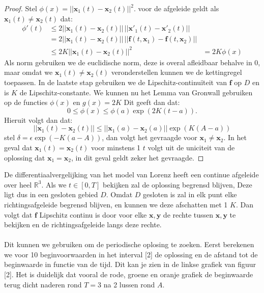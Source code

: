\documentclass[12pt, a4paper]{article}
\newcommand{\R}{\mathbb{R}}
\newcommand{\x}{\textbf{x}}
\theoremstyle{definition}
\begin{document}
\begin{proof}
Stel $\phi(x) = ||\x_1(t) - \x_2(t)||^2$. voor de afgeleide geldt als $\x_1(t) \neq \x_2(t)$ dat:
\begin{align*}
\phi'(t) &\leq 2||\x_1(t) - \x_2(t)|| \, ||\x'_1(t) - \x'_2(t)||\\
 &= 2||\x_1(t) - \x_2(t)|| \, ||\textbf{f}(t, \x_1) - \textbf{f}(t, \x_2)||\\
 &\leq 2K||\x_1(t) - \x_2(t)||^2
 &= 2K \phi(x)
\end{align*}
Als norm gebruiken we de euclidische norm, deze is overal afleidbaar behalve in $0$, maar omdat we $\x_1(t) \neq \x_2(t)$ veronderstellen kunnen we de kettingregel toepassen. In de laatste stap gebruiken we de Lipschitz-continuïteit van $\mathbf{f}$ op $D$ en is $K$ de Lipschitz-constante. We kunnen nu het Lemma van Gronwall gebruiken op de functies $\phi(x)$ en $g(x) = 2K$ Dit geeft dan dat:
$$0 \leq \phi(x) \leq \phi(a) \exp(2K(t-a)).$$
Hieruit volgt dan dat:
$$ ||\x_1(t) - \x_2(t)|| \leq ||\x_1(a) - \x_2(a)|| \exp(K(A-a)) $$
stel $\delta = \epsilon \exp(-K(a-A))$, dan volgt het gevraagde voor $\x_1 \neq \x_2$. In het geval dat $\x_1(t) = \x_2(t)$ voor minstens 1 $t$ volgt uit de uniciteit van de oplossing dat $\x_1 = \x_2$, in dit geval geldt zeker het gevraagde.
\end{proof}
De differentiaalvergelijking van het model van Lorenz heeft een continue afgeleide over heel $\R^3$. Als we $t\in [0, T]$ bekijken zal de oplossing begrensd blijven, Deze ligt dus in een gesloten gebied $D$. Omdat $D$ gesloten is zal in elk punt elke richtingsafgeleide begrensd blijven, en kunnen we deze afschatten met 1 $K$. Dan volgt dat $\mathbf{f}$ Lipschitz continu is door voor elke $\x, \mathbf{y}$ de rechte tussen $\x, \mathbf{y}$ te bekijken en de richtingsafgeleide langs deze rechte.\\
\\
Dit kunnen we gebruiken om de periodische oplosing te zoeken. Eerst berekenen we voor 10 beginvoorwaarden in het interval [2] de oplossing en de afstand tot de beginwaarde in functie van de tijd. Dit kan je zien in de linkse grafiek van figuur [2]. Het is duidelijk dat vooral de rode, groene en oranje grafiek de beginwaarde terug dicht naderen rond $T=3$ na 2 lussen rond $A$.
\end{document}
